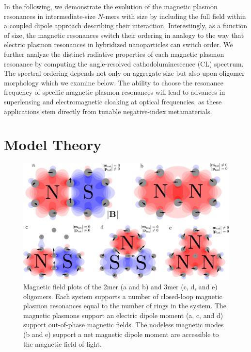 \documentclass[journal=apchd5,manuscript=article]{achemso}
\begin{document}
In the following, we demonstrate the evolution of the magnetic plasmon resonances in intermediate-size $N$-mers with size by including the full field within a coupled dipole approach describing their interaction. Interestingly, as a function of size, the magnetic resonances switch their ordering in analogy to the way that electric plasmon resonances in hybridized nanoparticles can switch order\cite{vonPlessen2007}. We further analyze the distinct radiative properties of each magnetic plasmon resonance by computing the angle-resolved cathodoluminescence (CL) spectrum\cite{Hohenester2014,Coenen2011,CoPol2011,Polman2014}. The spectral ordering depends not only on aggregate size but also upon oligomer morphology which we examine below. The ability to choose the resonance frequency of specific magnetic plasmon resonances will lead to advances in superlensing and electromagnetic cloaking at optical frequencies, as these applications stem directly from tunable negative-index metamaterials\cite{Pendry03,Fang2005,Cai2007,Pinchuk07,Shalaev2008,Valentine2008,Ferrari09}.

\section{Model Theory}

\begin{figure}
\includegraphics{2mer_3mer_fields.pdf}
\caption{Magnetic field plots of the 2mer (a and b) and 3mer (c, d, and e) oligomers. Each system supports a number of closed-loop magnetic plasmon resonances equal to the number of rings in the system. The magnetic plasmons support an electric dipole moment (a, c, and d) support out-of-phase magnetic fields. The nodeless magnetic modes (b and e) support a net magnetic dipole moment are accessible to the magnetic field of light.}
\label{field_plots}
\end{figure}
\end{document}

